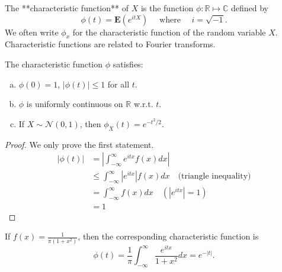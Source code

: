 \begin{definition}
The **characteristic function** of $X$ is the function $\phi: \mathbb{R} \mapsto \mathbb{C}$ defined by
\begin{equation*}
    \phi(t)=\mathbf{E}\left(e^{i t X}\right) \quad \text { where } \quad i=\sqrt{-1}.
\end{equation*}
We often write $\phi_x$ for the characteristic function of the random variable $X$. Characteristic functions are related to Fourier transforms. 
\end{definition}

\begin{theorem}
The characteristic function $\phi$ satisfies:
\begin{enumerate}[(a)]
    \item $\phi(0) = 1$, $\left\vert \phi(t) \right\vert \leq 1$ for all $t$.
    \item $\phi$ is uniformly continuous on $\mathbb{R}$ w.r.t. $t$.
    \item If $X \sim \mathcal{N}(0,1)$, then $\phi_{X}(t) = e^{-t^2/2}$.
\end{enumerate}
\end{theorem}

\begin{proof}
We only prove the first statement.
\begin{equation*}
    \begin{split}
        \left\vert \phi(t) \right\vert &= \left\vert \int_{-\infty}^\infty e^{itx} f(x)dx  \right\vert \\
        &\leq \int_{-\infty}^\infty \left\vert e^{itx} \right\vert f(x) dx \quad \text{(triangle inequality)} \\
        &= \int_{-\infty}^\infty f(x) dx \quad (\left\vert e^{itx} \right\vert=1) \\
        &= 1
    \end{split}
\end{equation*}
\end{proof}

\begin{example}
If $f(x) = 
\frac{1}{\pi(1+x^2)}$, then the corresponding characteristic function is 
\begin{equation*}
    \phi(t)=\frac{1}{\pi} \int_{-\infty}^{\infty} \frac{e^{i t x}}{1+x^{2}} d x = e^{-\left\vert t \right\vert}.
\end{equation*}
\end{example}

